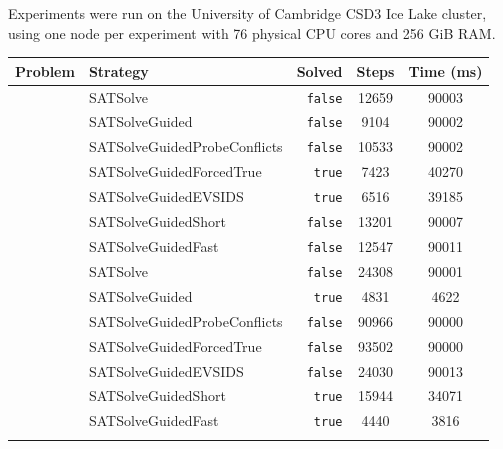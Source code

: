 \documentclass[11pt,twocolumn]{article}
\newcommand{\atom}[1]{\colorbox{Gray!30}{\ttfamily #1}}
\begin{document}
Experiments were run on the University of Cambridge CSD3 Ice Lake cluster, using one node per experiment with 76 physical CPU cores and 256 GiB RAM.

\begin{table}[t]
      \centering
      \scriptsize
      \begin{tabular}{@{}>{\ttfamily\bfseries}l l r S[table-format=5.0] S[table-format=6.0]@{}}
          \toprule
          {\rmfamily\bfseries Problem} & {\bfseries Strategy} & {\bfseries Solved} & {\bfseries Steps} & {\bfseries Time (ms)} \\
          \midrule
              & \atom{SATSolve}                     & \texttt{false}  & 12659 & 90003 \\
              & \atom{SATSolveGuided}               & \texttt{false}  &  9104 & 90002 \\
              & \atom{SATSolveGuidedProbeConflicts} & \texttt{false}  & 10533 & 90002 \\
              & \atom{SATSolveGuidedForcedTrue}     & \texttt{true} &  7423 & 40270 \\
              & \atom{SATSolveGuidedEVSIDS}         & \texttt{true} &  6516 & 39185 \\
              & \atom{SATSolveGuidedShort}          & \texttt{false}  & 13201 & 90007 \\
              & \atom{SATSolveGuidedFast}           & \texttt{false}  & 12547 & 90011 \\
          \addlinespace

              & \atom{SATSolve}                     & \texttt{false}  & 24308 & 90001 \\
              & \atom{SATSolveGuided}               & \texttt{true} &  4831 &  4622 \\
              & \atom{SATSolveGuidedProbeConflicts} & \texttt{false}  & 90966 & 90000 \\
              & \atom{SATSolveGuidedForcedTrue}     & \texttt{false}  & 93502 & 90000 \\
              & \atom{SATSolveGuidedEVSIDS}         & \texttt{false}  & 24030 & 90013 \\
              & \atom{SATSolveGuidedShort}          & \texttt{true} & 15944 & 34071 \\
              & \atom{SATSolveGuidedFast}           & \texttt{true} &  4440 &  3816 \\
          \addlinespace


\end{tabular}
\end{table}
\end{document}
